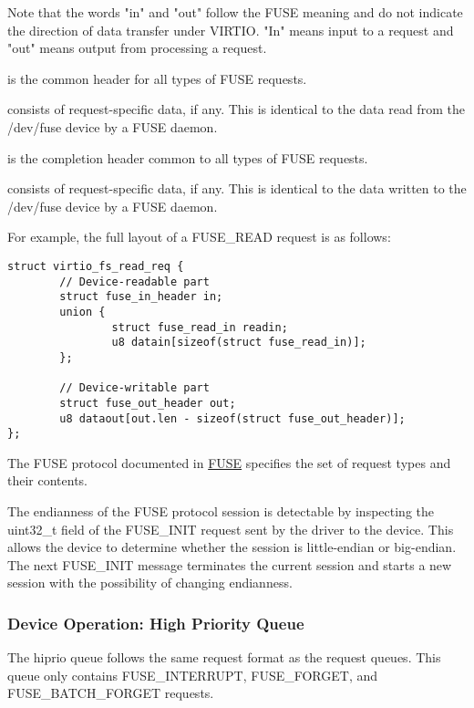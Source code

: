Note that the words "in" and "out" follow the FUSE meaning and do not indicate
the direction of data transfer under VIRTIO.  "In" means input to a request and
"out" means output from processing a request.

 is the common header for all types of FUSE requests.

 consists of request-specific data, if any.  This is identical to
the data read from the /dev/fuse device by a FUSE daemon.

 is the completion header common to all types of FUSE requests.

 consists of request-specific data, if any.  This is identical
to the data written to the /dev/fuse device by a FUSE daemon.

For example, the full layout of a FUSE\_READ request is as follows:

\begin{lstlisting}
struct virtio_fs_read_req {
        // Device-readable part
        struct fuse_in_header in;
        union {
                struct fuse_read_in readin;
                u8 datain[sizeof(struct fuse_read_in)];
        };

        // Device-writable part
        struct fuse_out_header out;
        u8 dataout[out.len - sizeof(struct fuse_out_header)];
};
\end{lstlisting}

The FUSE protocol documented in \hyperref[intro:FUSE]{FUSE} specifies the set
of request types and their contents.

The endianness of the FUSE protocol session is detectable by inspecting the
uint32\_t  field of the FUSE\_INIT request sent by the driver
to the device.  This allows the device to determine whether the session is
little-endian or big-endian.  The next FUSE\_INIT message terminates the
current session and starts a new session with the possibility of changing
endianness.

\subsubsection{Device Operation: High Priority Queue}\label{sec:Device Types / File System Device / Device Operation / Device Operation: High Priority Queue}

The hiprio queue follows the same request format as the request queues.  This
queue only contains FUSE\_INTERRUPT, FUSE\_FORGET, and FUSE\_BATCH\_FORGET
requests.

